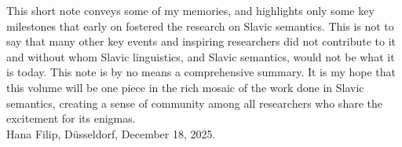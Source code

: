 \documentclass[output=paper]{langscibook}
\begin{document}
This short note conveys some of my memories, and highlights only some
key milestones that early on fostered the research on Slavic semantics. This is not to say that many other key events and inspiring researchers did not contribute to it and without whom Slavic linguistics, and Slavic semantics, would not be what it is today. This note is by no means a comprehensive summary. It is my hope that this volume will 
be one piece in the rich mosaic of the work done in Slavic semantics, creating a sense of community among all researchers who share the excitement for its enigmas. \\

\noindent
Hana Filip, Düsseldorf, December 18, 2025. 

\printbibliography[heading=subbibliography,notkeyword=this]
\end{document}
